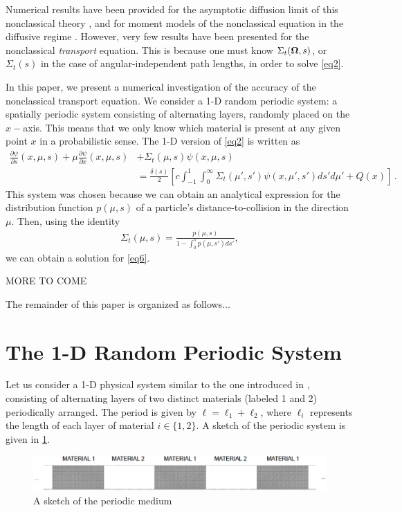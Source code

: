 \documentclass[12pt]{article}
\newcommand{\uomega}{{\bf \Omega}}
\begin{document}
Numerical results have been provided for the asymptotic diffusion limit of this nonclassical theory \cite{larvas11,vaslar09,vas13,vaslar14b}, and for moment models of the nonclassical equation in the diffusive regime \cite{kry13}.
However, very few results have been presented for the nonclassical \textit{transport} equation.
This is because one must know $\Sigma_t(\uomega,s)$, or $\Sigma_t(s)$ in the case of angular-independent path lengths, in order to solve \cref{eq2}. 

In this paper, we present a numerical investigation of the accuracy of the nonclassical transport equation.
We consider a 1-D random periodic system: a spatially periodic system consisting of alternating layers, randomly placed on the $x-$axis.
This means that we only know which material is present at any given point $x$ in a probabilistic sense.
The 1-D version of \cref{eq2} is written as
\begin{align}\label{eq6}
\frac{\partial\psi}{\partial s}(x,\mu,s) + \mu\frac{\partial \psi}{\partial x}(x,\mu,s) &+ \Sigma_t(\mu,s)\psi(x,\mu,s) 
\\& = \frac{\delta(s)}{2}\left[ c\int_{-1}^1\int_0^\infty \Sigma_t(\mu',s')\psi(x,\mu',s')ds' d\mu' + Q(x) \right]\,. \nonumber
\end{align}
This system was chosen because we can obtain an analytical expression for the distribution function $p(\mu,s)$ of a particle's distance-to-collision in the direction $\mu$.
Then, using the identity \cite{vaslar14a}
\begin{align}\label{eq7}
\Sigma_t(\mu,s)=\frac{p(\mu,s)}{1-\int_0^sp(\mu,s')ds'},
\end{align}
we can obtain a solution for \cref{eq6}.

MORE TO COME

The remainder of this paper is organized as follows...    

\section{The 1-D Random Periodic System}\label{sec2}

Let us consider a 1-D physical system similar to the one introduced in \cite{zuc94}, consisting of alternating layers of two distinct materials (labeled 1 and 2) periodically arranged.
The period is given by $\ell = \ell_1 + \ell_2$, where $\ell_i$ represents the length of each layer of material $i \in \{1,2\}$.
A sketch of the periodic system is given in \cref{fig1}.
\begin{figure}[htb]
  \centering
  \includegraphics[width=\textwidth]{fig1.eps}
  \caption{A sketch of the periodic medium}
  \label{fig1}
\end{figure}
\end{document}
